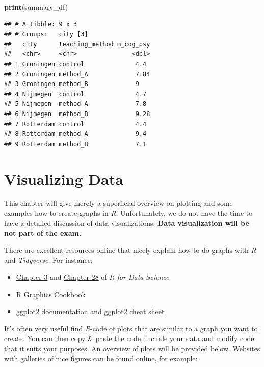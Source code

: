 \documentclass[
]{scrartcl}
\newenvironment{Shaded}{\begin{snugshade}}{\end{snugshade}}
\newcommand{\KeywordTok}[1]{\textcolor[rgb]{0.13,0.29,0.53}{\textbf{#1}}}
\newcommand{\NormalTok}[1]{#1}
\providecommand{\tightlist}{%
  \setlength{\itemsep}{0pt}\setlength{\parskip}{0pt}}
\begin{document}
\begin{Shaded}
\begin{Highlighting}[]
\KeywordTok{print}\NormalTok{(summary\_df)}
\end{Highlighting}
\end{Shaded}

\begin{verbatim}
## # A tibble: 9 x 3
## # Groups:   city [3]
##   city      teaching_method m_cog_psy
##   <chr>     <chr>               <dbl>
## 1 Groningen control              4.4 
## 2 Groningen method_A             7.84
## 3 Groningen method_B             9   
## 4 Nijmegen  control              4.7 
## 5 Nijmegen  method_A             7.8 
## 6 Nijmegen  method_B             9.28
## 7 Rotterdam control              4.4 
## 8 Rotterdam method_A             9.4 
## 9 Rotterdam method_B             7.1
\end{verbatim}

\hypertarget{visualizing-data}{%
\section{Visualizing Data}\label{visualizing-data}}

This chapter will give merely a superficial overview on plotting and some examples how to create graphs in \emph{R}. Unfortunately, we do not have the time to have a detailed discussion of data visualizations. \textbf{Data visualization will be not part of the exam.}

There are excellent resources online that nicely explain how to do graphs with \emph{R} and \emph{Tidyverse}. For instance:

\begin{itemize}
\tightlist
\item
  \href{http://r4ds.had.co.nz/data-visualisation.html}{Chapter 3} and \href{Chapter\%2028:\%20Graphics\%20for\%20communication}{Chapter 28} of \emph{R for Data Science}
\item
  \href{http://www.cookbook-r.com/Graphs/}{R Graphics Cookbook}
\item
  \href{https://ggplot2.tidyverse.org/reference/}{ggplot2 documentation} and \protect\hyperlink{cheatsheets}{ggplot2 cheat sheet}
\end{itemize}

It's often very useful find \emph{R}-code of plots that are similar to a graph you want to create. You can then copy \& paste the code, include your data and modify code that it suits your purposes. An overview of plots will be provided below. Websites with galleries of nice figures can be found online, for example:
\end{document}
